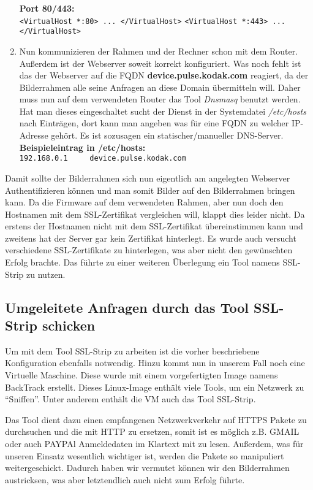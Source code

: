 \begin{flushleft}
\begin{enumerate}
      \vspace{.5cm}
      \textbf{Port 80/443:}\\
      \verb|<VirtualHost *:80> ... </VirtualHost>|
      \verb|<VirtualHost *:443> ... </VirtualHost>|
      \item Nun kommunizieren der Rahmen und der Rechner schon mit dem Router. Außerdem ist der Webserver soweit korrekt konfiguriert. Was noch fehlt ist das der Webserver auf die FQDN \textbf{device.pulse.kodak.com} reagiert, da der Bilderrahmen alle seine Anfragen an diese Domain übermitteln will. Daher muss nun auf dem verwendeten Router das Tool \textit{Dnsmasq} benutzt werden. Hat man dieses eingeschaltet sucht der Dienst in der Systemdatei \textit{/etc/hosts} nach Einträgen, dort kann man angeben was für eine FQDN zu welcher IP-Adresse gehört. Es ist sozusagen ein statischer/manueller DNS-Server.\\\vspace{.3cm}
      \textbf{Beispieleintrag in /etc/hosts:}\\
      \verb|192.168.0.1 	device.pulse.kodak.com|
    \end{enumerate}
    Damit sollte der Bilderrahmen sich nun eigentlich am angelegten Webserver Authentifizieren können und man somit Bilder auf den Bilderrahmen bringen kann. Da die Firmware auf dem verwendeten Rahmen, aber nun doch den Hostnamen mit dem SSL-Zertifikat vergleichen will, klappt dies leider nicht. Da erstens der Hostnamen nicht mit dem SSL-Zertifikat übereinstimmen kann und zweitens hat der Server gar kein Zertifikat hinterlegt. Es wurde auch versucht verschiedene SSL-Zertifikate zu hinterlegen, was aber nicht den gewünschten Erfolg brachte. Das führte zu einer weiteren Überlegung ein Tool namens SSL-Strip zu nutzen.
  \subsection{Umgeleitete Anfragen durch das Tool SSL-Strip schicken}
    Um mit dem Tool SSL-Strip zu arbeiten ist die vorher beschriebene Konfiguration ebenfalls notwendig. Hinzu kommt nun in unserem Fall noch eine Virtuelle Maschine. Diese wurde mit einem vorgefertigten Image namens BackTrack erstellt. Dieses Linux-Image enthält viele Tools, um ein Netzwerk zu ``Sniffen''. Unter anderem enthält die VM auch das Tool SSL-Strip.
    
    Das Tool dient dazu einen empfangenen Netzwerkverkehr auf HTTPS Pakete zu durchsuchen und die mit HTTP zu ersetzen, somit ist es möglich z.B. GMAIL oder auch PAYPAl Anmeldedaten im Klartext mit zu lesen. Außerdem, was für unseren Einsatz wesentlich wichtiger ist, werden die Pakete so manipuliert weitergeschickt. Dadurch haben wir vermutet können wir den Bilderrahmen austricksen, was aber letztendlich auch nicht zum Erfolg führte.
    

\end{flushleft}
